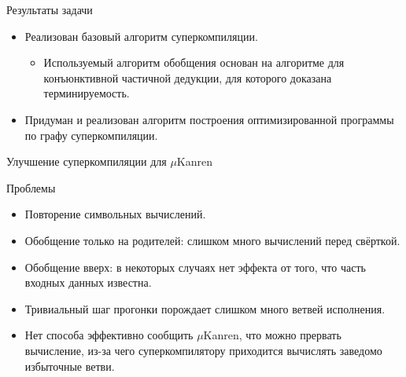 \documentclass[xcolor=table]{beamer}
\begin{document}
\begin{frame}{Результаты задачи}
\begin{itemize}
\item Реализован базовый алгоритм суперкомпиляции.
\begin{itemize}
\item Используемый алгоритм обобщения основан на алгоритме для конъюнктивной частичной дедукции,
      для которого доказана терминируемость.
\end{itemize}
\item Придуман и реализован алгоритм построения оптимизированной программы по графу суперкомпиляции.
\end{itemize}
\end{frame}

\begin{frame}{Улучшение суперкомпиляции для $\mu$Kanren}
\begin{block}{Проблемы}
\begin{itemize}
\item Повторение символьных вычислений.\\
\item Обобщение только на родителей: слишком много вычислений перед свёрткой.
\item Обобщение вверх: в некоторых случаях нет эффекта от того, что часть входных данных известна.
\item Тривиальный шаг прогонки порождает слишком много ветвей исполнения.\\
\item Нет способа эффективно сообщить $\mu$Kanren, что можно прервать вычисление, из-за
чего суперкомпилятору приходится вычислять заведомо избыточные ветви.\\
\end{itemize}
\end{block}
\end{frame}
\end{document}
